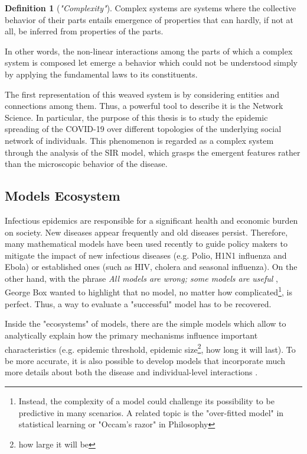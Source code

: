 \documentclass[a4paper,12pt,twoside]{book} %
\theoremstyle{definition}
\newtheorem{definition}{Definition}[section]
\begin{document}
\begin{definition}[\textit{"Complexity"}]
Complex systems are systems where the collective behavior of their parts entails emergence of properties that can hardly, if not at all, be inferred from properties of the parts.
\end{definition}

In other words, the non-linear interactions among the parts of which a complex system is composed let emerge a behavior which could not be understood simply by applying the fundamental laws to its constituents.

The first representation of this weaved system is by considering entities and connections among them. Thus, a powerful tool to describe it is the Network Science.
In particular, the purpose of this thesis is to study the epidemic spreading of the COVID-19 over different topologies of the underlying social network of individuals. This phenomenon is regarded as a complex system through the analysis of the SIR model, which grasps the emergent features rather than the microscopic behavior of the disease.

\subsection{Models Ecosystem}
Infectious epidemics are responsible for a significant health and economic burden on society. New diseases appear frequently and old diseases persist. Therefore, many mathematical models have been used recently to guide policy makers to mitigate the impact of new infectious diseases (e.g. Polio, H1N1 influenza and Ebola) or established ones (such as HIV, cholera and seasonal influenza).
On the other hand, with the phrase \textit{All models are wrong; some models are useful} \cite{Box::2005_StatDesign}, George Box wanted to highlight that no model, no matter how complicated\footnote{Instead, the complexity of a model could challenge its possibility to be predictive in many scenarios. A related topic is the "over-fitted model" in statistical learning or "Occam's razor" in Philosophy}, is perfect. Thus, a way to evaluate a "successful" model has to be recovered.

Inside the "ecosystems" of models, there are the simple models which allow to analytically explain how the primary mechanisms influence important characteristics (e.g. epidemic threshold, epidemic size\footnote{how large it will be}, how long it will last). To be more accurate, it is also possible to develop models that incorporate much more details about both the disease and individual-level interactions \cite{Kiss::MathOfEpiOnNet}.
\end{document}
